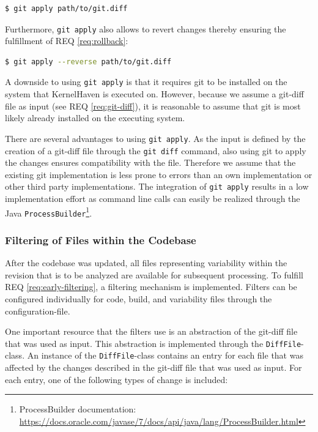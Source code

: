 \documentclass[a4paper]{article}
\begin{document}
\begin{lstlisting}[language=bash]
  $ git apply path/to/git.diff
\end{lstlisting}

 Furthermore, \texttt{git apply} also allows to revert changes thereby ensuring the fulfillment of REQ \ref{req:rollback}:
 \begin{lstlisting}[language=bash]
  $ git apply --reverse path/to/git.diff
\end{lstlisting}
 
 A downside to using \texttt{git apply} is that it requires git to be installed on the system that KernelHaven is executed on. However, because we assume a git-diff file as input (see REQ \ref{req:git-diff}), it is reasonable to assume that git is most likely already installed on the executing system.

There are several advantages to using \texttt{git apply}. As the input is defined by the creation of a git-diff file through the \texttt{git diff} command, also using git to apply the changes ensures compatibility with the file. Therefore we assume that the existing git implementation is less prone to errors than an own implementation or other third party implementations. The integration of \texttt{git apply} results in a low implementation effort as command line calls can easily be realized through the Java \texttt{ProcessBuilder}\footnote{ProcessBuilder documentation: \url{https://docs.oracle.com/javase/7/docs/api/java/lang/ProcessBuilder.html}}.

\subsubsection{Filtering of Files within the Codebase}\label{filtering-input}

After the codebase was updated, all files representing variability within the revision that is to be analyzed are available for subsequent processing. To fulfill REQ \ref{req:early-filtering}, a filtering mechanism is implemented. Filters can be configured individually for code, build, and variability files through the configuration-file.

One important resource that the filters use is an abstraction of the git-diff file that was used as input. This abstraction is implemented through the \texttt{DiffFile}-class.
An instance of the \texttt{DiffFile}-class contains an entry for each file that was affected by the changes described in the git-diff file that was used as input. For each entry, one of the following types of change is included:
\end{document}
